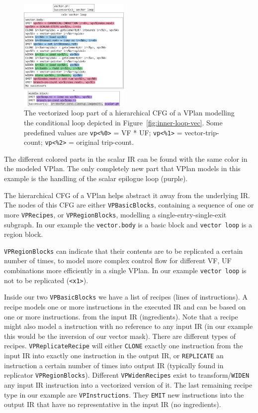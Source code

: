 \documentclass[sigplan,11pt,nonacm]{acmart}
\begin{document}
\begin{figure}
  \centering
  \includegraphics[width=0.475\textwidth]{images/inner-loop-vplan-hcfg-loop-body-color.png}
  \caption{The vectorized loop part of a hierarchical CFG of a VPlan modelling the conditional loop
  depicted in Figure~\ref{fig:inner-loop-vec}. Some predefined values are
  \texttt{vp<\%0>} = VF * UF; \texttt{vp<\%1>} = vector-trip-count; \texttt{vp<\%2>} = original trip-count.}
  \label{fig:inner-loop-vplan-hcfg-body}
\end{figure}

The different colored parts in the scalar IR can be found with the same color in the modeled VPlan.
The only completely new part that VPlan models in this example is the handling of the scalar epilogue
loop (purple).

The hierarchical CFG of a VPlan helps abstract it away from the underlying IR. The nodes of this CFG
are either \texttt{VPBasicBlocks}, containing a sequence of one or more \texttt{VPRecipes}, or
\texttt{VPRegionBlocks}, modelling a single-entry-single-exit subgraph.
In our example the \texttt{vector.body} is a basic block and \texttt{vector loop} is a region block.

\texttt{VPRegionBlocks} can indicate that their contents are to be replicated a certain number of times,
to model more complex control flow for different VF, UF combinations more efficiently in a single VPlan. 
In our example \texttt{vector loop} is not to be replicated (\texttt{<x1>}).

Inside our two \texttt{VPBasicBlocks} we have a list of recipes (lines of instructions). A recipe
models one or more instructions in the executed IR and can be based on one or more instructions.
from the input IR (ingredients). Note that a recipe might also model a instruction with no reference to any input
IR (in our example this would be the inversion of our vector mask). There are different types of 
recipes. \texttt{VPReplicateRecipe} will either \texttt{CLONE} exactly one instruction from the input IR
into exactly one instruction in the output IR, or \texttt{REPLICATE} an instruction a certain number
of times into output IR (typically found in replicator \texttt{VPRegionBlocks}). Different 
\texttt{VPWidenRecipes} exist to transform/\texttt{WIDEN} any input IR instruction into a vectorized 
version of it. The last remaining recipe type in our example are \texttt{VPInstructions}. They
\texttt{EMIT} new instructions into the output IR that have no representative in the input IR (no
ingredients).
\end{document}
